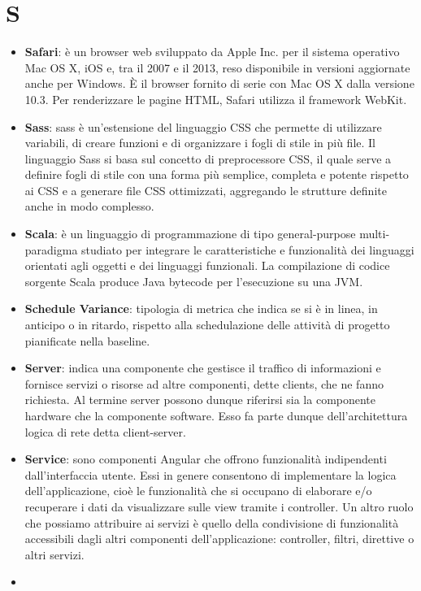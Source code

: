 \section{S}
\begin{itemize} 
	\item
	\textbf{Safari}: è un browser web sviluppato da Apple Inc. per il sistema operativo Mac OS X, iOS e, tra il 2007 e il 2013, reso disponibile in versioni aggiornate anche per Windows. È il browser fornito di serie con Mac OS X dalla versione 10.3. Per renderizzare le pagine HTML, Safari utilizza il framework WebKit.
	\item
	\textbf{Sass}: sass è un'estensione del linguaggio CSS che permette di utilizzare variabili, di creare funzioni e di organizzare i fogli di stile in più file. Il linguaggio Sass si basa sul concetto di preprocessore CSS, il quale serve a definire fogli di stile con una forma più semplice, completa e potente rispetto ai CSS e a generare file CSS ottimizzati, aggregando le strutture definite anche in modo complesso.
	\item
	\textbf{Scala}: è un linguaggio di programmazione di tipo general-purpose multi-paradigma studiato per integrare le caratteristiche e funzionalità dei linguaggi orientati agli oggetti e dei linguaggi funzionali. La compilazione di codice sorgente Scala produce Java bytecode per l'esecuzione su una JVM.
	\item
	\textbf{Schedule Variance}: tipologia di metrica che indica se si è in linea, in anticipo o in ritardo, rispetto alla schedulazione delle attività di progetto pianificate nella baseline.
	\item
	\textbf{Server}: indica una componente che gestisce il traffico di informazioni e fornisce servizi o risorse ad altre componenti, dette clients, che ne fanno richiesta. Al termine server possono dunque riferirsi sia la componente hardware che la componente software. Esso fa parte dunque dell'architettura logica di rete detta client-server.
	\item
	\textbf{Service}: sono componenti Angular che offrono funzionalità indipendenti dall’interfaccia utente. Essi in genere consentono di implementare la logica dell’applicazione, cioè le funzionalità che si occupano di elaborare e/o recuperare i dati da visualizzare sulle view tramite i controller.
	Un altro ruolo che possiamo attribuire ai servizi è quello della condivisione di funzionalità accessibili dagli altri componenti dell’applicazione: controller, filtri, direttive o altri servizi.
	\item

\end{itemize}
